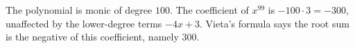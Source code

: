 The polynomial is monic of degree $100$. The coefficient of $x^{99}$ is $-100\cdot3=-300$, unaffected by the lower-degree terms $-4x+3$. Vieta's formula says the root sum is the negative of this coefficient, namely $\boxed{300}$.
